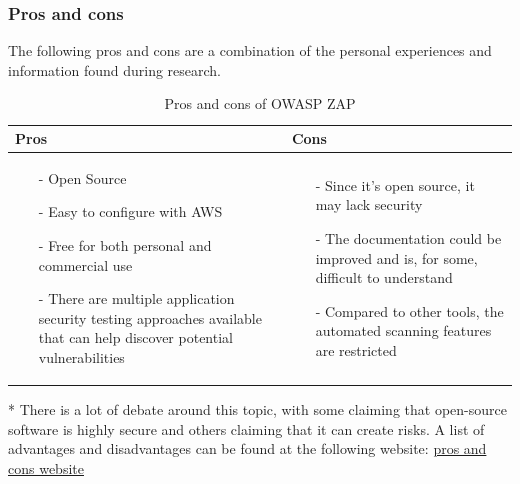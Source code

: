\subsubsection{Pros and cons}
The following pros and cons are a combination of the personal experiences and information found during research.\cite{prosconsZAP}
\begin{table}[H]
    \begin{threeparttable}
        \begin{tabular}{|>{\raggedright\arraybackslash}p{6cm}|>{\raggedright\arraybackslash}p{6cm}|}
            \hline
            \textbf{Pros} & \textbf{Cons} \\
            \hline
            \begin{itemize}
                \item [-]Open Source
                \item [-]Easy to configure with AWS
                \item [-] Free for both personal and commercial use
                \item [-]There are multiple application security testing approaches available that can help discover potential vulnerabilities
            \end{itemize}
            & 
            \begin{itemize}
                \item [-] Since it's open source, it may lack security\tnote{*}
                \item [-] The documentation could be improved and is, for some, difficult to understand
                \item [-]Compared to other tools, the automated scanning features are restricted
            \end{itemize}
            \\
            \hline
        \end{tabular}
        \begin{tablenotes}
            \item[*] There is a lot of debate around this topic,  with some claiming that open-source software is highly secure and others claiming that it can create risks. A list of advantages and disadvantages can be found at the following website: \href{https://cybersecuritynews.com/pros-and-cons-of-using-open-source-software/}{pros and cons website}
            \caption{Pros and cons of OWASP ZAP}
        \end{tablenotes}
    \end{threeparttable}
\end{table}


